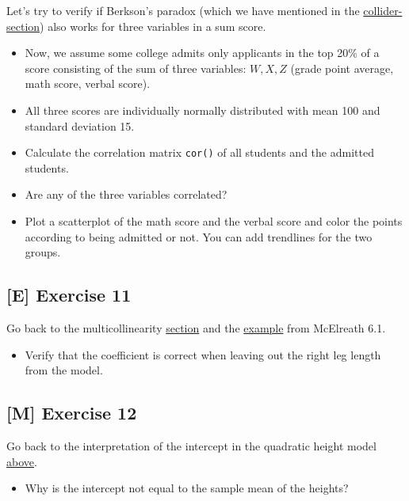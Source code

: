 \documentclass[
]{book}
\providecommand{\tightlist}{%
  \setlength{\itemsep}{0pt}\setlength{\parskip}{0pt}}
\begin{document}
Let's try to verify if Berkson's paradox (which we have mentioned in the
\hyperref[collider]{collider-section}) also works for three variables in a sum score.

\begin{itemize}
\tightlist
\item
  Now, we assume some college admits only applicants in the top 20\% of a score
  consisting of the sum of three variables: \(W, X, Z\) (grade point average, math score, verbal score).
\item
  All three scores are individually normally distributed with mean 100 and standard deviation 15.
\item
  Calculate the correlation matrix \texttt{cor()} of all students and the admitted students.
\item
  Are any of the three variables correlated?
\item
  Plot a scatterplot of the math score and the verbal score and color the points according
  to being admitted or not. You can add trendlines for the two groups.
\end{itemize}

\subsection{{[}E{]} Exercise 11}\label{exercise11_multiple_regression}

Go back to the multicollinearity \hyperref[multicollinearity]{section} and the \hyperref[mcElreath_6.1]{example}
from McElreath 6.1.

\begin{itemize}
\tightlist
\item
  Verify that the coefficient is correct when leaving out the right leg length from the model.
\end{itemize}

\subsection{{[}M{]} Exercise 12}\label{exercise12_multiple_regression}

Go back to the interpretation of the intercept in the quadratic height model \hyperref[interpretation_output_freq_quadratic]{above}.

\begin{itemize}
\tightlist
\item
  Why is the intercept not equal to the sample mean of the heights?
\end{itemize}
\end{document}
